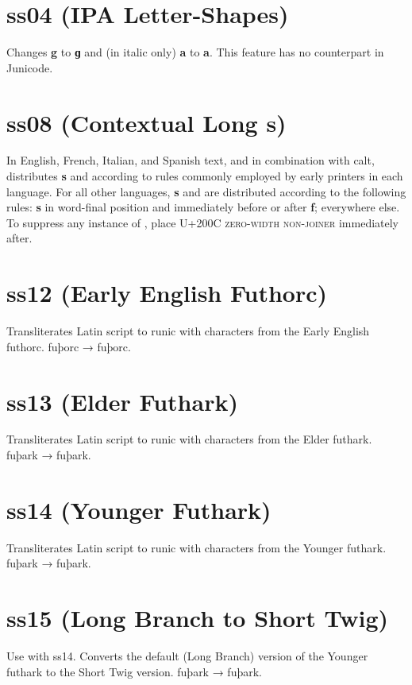 \documentclass[12pt,letterpaper,openany]{book}
\begin{document}
\section{ss04 (IPA Letter-Shapes)}
Changes \textbf{g} to \textbf{ɡ} and (in italic only)
\textbf{a} to \textbf{ a}. This feature has no counterpart in
Junicode.

\section{ss08 (Contextual Long s)}
In English, French, Italian, and Spanish text, and in combination with calt, distributes \textbf{s} and
\textbf{}
according to rules commonly employed by early printers in each language. For all other languages,
\textbf{s} and \textbf{} are distributed according to the following rules:
\textbf{s} in word-final position and immediately before or after \textbf{f};
\textbf{} everywhere else. To suppress any instance of \textbf{},
place U+200C \textsc{zero-width non-joiner} immediately after.

\section{ss12 (Early English Futhorc)}
Transliterates Latin script to runic with characters from the Early English futhorc. fuþorc
→ { fuþorc}.

\section{ss13 (Elder Futhark)}
Transliterates Latin script to runic with characters from the Elder futhark. fuþark
→ { fuþark}.

\section{ss14 (Younger Futhark)}
Transliterates Latin script to runic with characters from the Younger futhark. fuþark
→ { fuþark}.

\section{ss15 (Long Branch to Short Twig)}
Use with ss14. Converts the default (Long Branch) version of the Younger futhark
to the Short Twig version. fuþark
→ { fuþark}.
\end{document}
